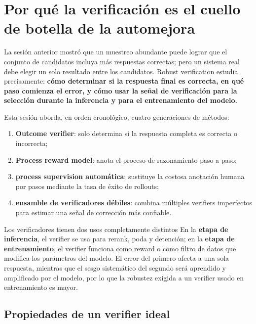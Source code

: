 \documentclass[a4paper]{article}
\begin{document}
\makelecturetitle

\section{Por qué la verificación es el cuello de botella de la automejora}

La sesión anterior mostró que un muestreo abundante puede lograr que el conjunto de candidatos incluya más respuestas correctas; pero un sistema real debe elegir un solo resultado entre los candidatos. Robust verification estudia precisamente: \textbf{cómo determinar si la respuesta final es correcta, en qué paso comienza el error, y cómo usar la señal de verificación para la selección durante la inferencia y para el entrenamiento del modelo.}

Esta sesión aborda, en orden cronológico, cuatro generaciones de métodos:

\begin{enumerate}
    \item \textbf{Outcome verifier}: solo determina si la respuesta completa es correcta o incorrecta;
    \item \textbf{Process reward model}: anota el proceso de razonamiento paso a paso;
    \item \textbf{process supervision automática}: sustituye la costosa anotación humana por pasos mediante la tasa de éxito de rollouts;
    \item \textbf{ensamble de verificadores débiles}: combina múltiples verifiers imperfectos para estimar una señal de corrección más confiable.
\end{enumerate}

\begin{importantbox}{Los verificadores tienen dos usos completamente distintos}
En la \textbf{etapa de inferencia}, el verifier se usa para rerank, poda y detención; en la \textbf{etapa de entrenamiento}, el verifier funciona como reward o como filtro de datos que modifica los parámetros del modelo. El error del primero afecta a una sola respuesta, mientras que el sesgo sistemático del segundo será aprendido y amplificado por el modelo, por lo que la robustez exigida a un verifier usado en entrenamiento es mayor.
\end{importantbox}

\subsection{Propiedades de un verifier ideal}
\end{document}
